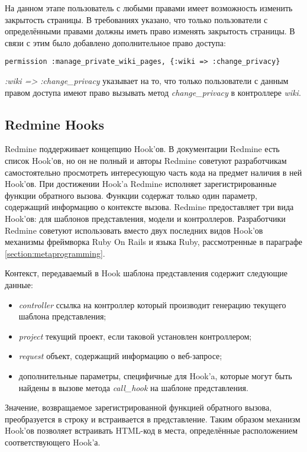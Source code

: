 На данном этапе пользователь с любыми правами имеет возможность изменить
закрытость страницы. В требованиях указано, что только пользователи с
определёнными правами должны иметь право изменять закрытость страницы. В связи
с этим было добавлено дополнительное право доступа:
\small{\begin{lstlisting}
permission :manage_private_wiki_pages, {:wiki => :change_privacy}
\end{lstlisting}}
\textit{:wiki => :change\_privacy} указывает на то, что только пользователи с
данным правом доступа имеют право вызывать метод \textit{change\_privacy} в
контроллере \textit{wiki}.

\subsection{Redmine Hooks}
\label{section:redmine_hooks}
Redmine поддерживает концепцию Hook'ов.  В документации Redmine есть список
Hook'ов, но он не полный и авторы Redmine советуют разработчикам самостоятельно
просмотреть интересующую часть кода на предмет наличия в ней Hook'ов. При
достижении Hook'a Redmine исполняет зарегистрированные функции обратного
вызова. Функции содержат только один параметр, содержащий информацию о
контексте вызова. Redmine предоставляет три вида Hook'ов: для шаблонов
представления, модели и контроллеров. Разработчики Redmine советуют
использовать вместо двух последних видов Hook'ов механизмы фреймворка Ruby On
Rails и языка Ruby, рассмотренные в параграфе \ref{section:metaprogramming}.

Контекст, передаваемый в Hook шаблона представления содержит следующие данные:
\begin{itemize}
  \item \textit{controller} ссылка на контроллер который производит генерацию
  текущего шаблона представления;
  \item \textit{project} текущий проект, если таковой установлен контроллером;
  \item \textit{request} объект, содержащий информацию о веб-запросе;
  \item дополнительные параметры, специфичные для Hook'a, которые могут
  быть найдены в вызове метода \textit{call\_hook} на шаблоне представления.
\end{itemize}
Значение, возвращаемое зарегистрированной функцией обратного вызова,
преобразуется в строку и встраивается в представление. Таким образом механизм
Hook'ов позволяет встраивать HTML-код в места, определённые расположением
соответствующего Hook'а.

